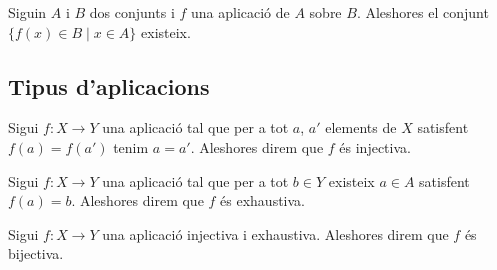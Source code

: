 \documentclass[../Apunts.tex]{subfiles}
\begin{document}
	\begin{axiom}
		Siguin \(A\) i \(B\) dos conjunts i \(f\) una aplicació de \(A\) sobre \(B\). Aleshores el conjunt \(\{f(x)\in B\mid x\in A\}\) existeix.
	\end{axiom}
	\subsection{Tipus d'aplicacions}
	\begin{definition}
		\label{def:aplicació injectiva}
		Sigui \(f\colon X\longrightarrow Y\) una aplicació tal que per a tot \(a\), \(a'\) elements de \(X\) satisfent \(f(a)=f(a')\) tenim \(a=a'\). Aleshores direm que \(f\) és injectiva.
	\end{definition}
	\begin{definition}
		\label{def:aplicació exhaustiva}
		Sigui \(f\colon X\longrightarrow Y\) una aplicació tal que per a tot \(b\in Y\) existeix \(a\in A\) satisfent \(f(a)=b\). Aleshores direm que \(f\) és exhaustiva.
	\end{definition}
	\begin{definition}
		\label{def:aplicació bijectiva}
		Sigui \(f\colon X\longrightarrow Y\) una aplicació injectiva i exhaustiva. Aleshores direm que \(f\) és bijectiva.
	\end{definition}
\end{document}
